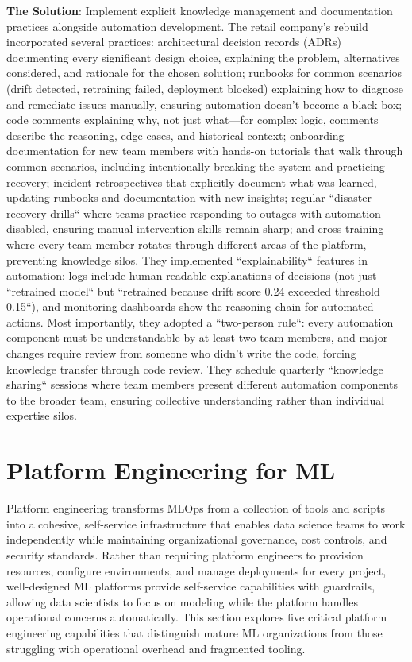 \textbf{The Solution}: Implement explicit knowledge management and documentation practices alongside automation development. The retail company's rebuild incorporated several practices: architectural decision records (ADRs) documenting every significant design choice, explaining the problem, alternatives considered, and rationale for the chosen solution; runbooks for common scenarios (drift detected, retraining failed, deployment blocked) explaining how to diagnose and remediate issues manually, ensuring automation doesn't become a black box; code comments explaining why, not just what---for complex logic, comments describe the reasoning, edge cases, and historical context; onboarding documentation for new team members with hands-on tutorials that walk through common scenarios, including intentionally breaking the system and practicing recovery; incident retrospectives that explicitly document what was learned, updating runbooks and documentation with new insights; regular ``disaster recovery drills`` where teams practice responding to outages with automation disabled, ensuring manual intervention skills remain sharp; and cross-training where every team member rotates through different areas of the platform, preventing knowledge silos. They implemented ``explainability`` features in automation: logs include human-readable explanations of decisions (not just ``retrained model`` but ``retrained because drift score 0.24 exceeded threshold 0.15``), and monitoring dashboards show the reasoning chain for automated actions. Most importantly, they adopted a ``two-person rule``: every automation component must be understandable by at least two team members, and major changes require review from someone who didn't write the code, forcing knowledge transfer through code review. They schedule quarterly ``knowledge sharing`` sessions where team members present different automation components to the broader team, ensuring collective understanding rather than individual expertise silos.

\section{Platform Engineering for ML}

Platform engineering transforms MLOps from a collection of tools and scripts into a cohesive, self-service infrastructure that enables data science teams to work independently while maintaining organizational governance, cost controls, and security standards. Rather than requiring platform engineers to provision resources, configure environments, and manage deployments for every project, well-designed ML platforms provide self-service capabilities with guardrails, allowing data scientists to focus on modeling while the platform handles operational concerns automatically. This section explores five critical platform engineering capabilities that distinguish mature ML organizations from those struggling with operational overhead and fragmented tooling.

